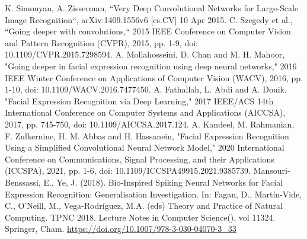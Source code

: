 \documentclass[conference]{IEEEtran}
\begin{document}
\begin{thebibliography}{00}
     K. Simonyan, A. Zisserman, ``Very Deep Convolutional Networks for Large-Scale Image Recognition``, arXiv:1409.1556v6 [cs.CV] 10 Apr 2015.
     C. Szegedy et al., ``Going deeper with convolutions,`` 2015 IEEE Conference on Computer Vision and Pattern Recognition (CVPR), 2015, pp. 1-9, doi: 10.1109/CVPR.2015.7298594.
    	A. Mollahosseini, D. Chan and M. H. Mahoor, "Going deeper in facial expression recognition using deep neural networks," 2016 IEEE Winter Conference on Applications of Computer Vision (WACV), 2016, pp. 1-10, doi: 10.1109/WACV.2016.7477450.
    	A. Fathallah, L. Abdi and A. Douik, "Facial Expression Recognition via Deep Learning," 2017 IEEE/ACS 14th International Conference on Computer Systems and Applications (AICCSA), 2017, pp. 745-750, doi: 10.1109/AICCSA.2017.124.
    	A. Kandeel, M. Rahmanian, F. Zulkernine, H. M. Abbas and H. Hassanein, "Facial Expression Recognition Using a Simplified Convolutional Neural Network Model," 2020 International Conference on Communications, Signal Processing, and their Applications (ICCSPA), 2021, pp. 1-6, doi: 10.1109/ICCSPA49915.2021.9385739.
    	Mansouri-Benssassi, E., Ye, J. (2018). Bio-Inspired Spiking Neural Networks for Facial Expression Recognition: Generalisation Investigation. In: Fagan, D., Martín-Vide, C., O'Neill, M., Vega-Rodríguez, M.A. (eds) Theory and Practice of Natural Computing. TPNC 2018. Lecture Notes in Computer Science(), vol 11324. Springer, Cham. \url{https://doi.org/10.1007/978-3-030-04070-3_33}

\end{thebibliography}
\vspace{12pt}
\end{document}
